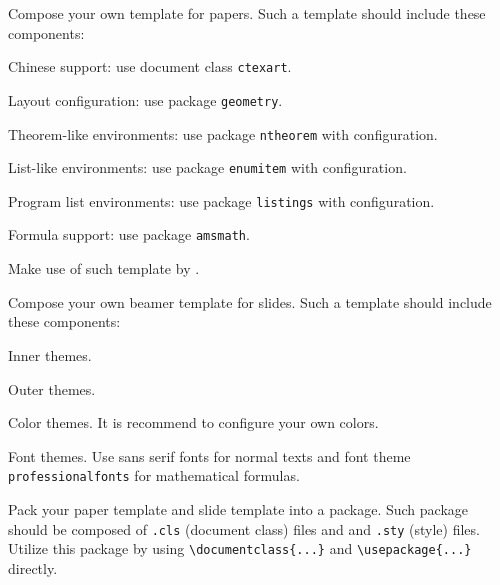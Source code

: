 \documentclass[english]{../TeXTemplate/pkupaper}
\begin{document}
\begin{thmquestion} \label{Ques:ArtTemp}
Compose your own template for papers. Such a template should include these components:
\begin{partlist}
\item Chinese support: use document class \verb"ctexart".
\item Layout configuration: use package \verb"geometry".
\item Theorem-like environments: use package \verb"ntheorem" with configuration.
\item List-like environments: use package \verb"enumitem" with configuration.
\item Program list environments: use package \verb"listings" with configuration.
\item Formula support: use package \verb"amsmath".
\end{partlist}
Make use of such template by \verb"".
\end{thmquestion}

\begin{thmquestion} \label{Ques:BeaTemp}
Compose your own beamer template for slides. Such a template should include these components:
\begin{partlist}
\item Inner themes.
\item Outer themes.
\item Color themes. It is recommend to configure your own colors.
\item Font themes. Use sans serif fonts for normal texts and font theme \verb"professionalfonts" for mathematical formulas.
\end{partlist}
\end{thmquestion}

\begin{thmquestion} \label{Ques:Pack}
Pack your paper template and slide template into a package. Such package should be composed of \verb".cls" (document class) files and and \verb".sty" (style) files. Utilize this package by using \verb"\documentclass{...}" and \verb"\usepackage{...}" directly.
\end{thmquestion}
\end{document}
